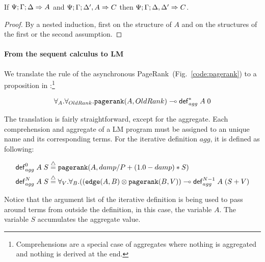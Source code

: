 \begin{theorem}
If $\Psi ; \Gamma ; \Delta \Rightarrow A$ and $\Psi ; \Gamma ; \Delta',
   A \Rightarrow C$ then $\Psi ; \Gamma ; \Delta, \Delta' \Rightarrow C$.
\end{theorem}
\begin{proof}
By a nested induction, first on the structure of $A$ and on the structures of
the first or the second assumption.
\end{proof}

\paragraph{From the \fragment sequent calculus to LM}

We translate the rule of the asynchronous PageRank~(Fig.~\ref{code:pagerank}) to
a proposition in \fragment:\footnote{Comprehensions are a special case of
aggregates where nothing is aggregated and nothing is derived at the end.}

{\stuffsize
\begin{align}
\forall_A. \forall_{OldRank}. \mathtt{pagerank}(A, OldRank) \multimap \mathsf{def}_{agg}^{*}
\; A \; 0
\end{align}
}

The translation is fairly straightforward, except for the aggregate. Each
comprehension and aggregate of a LM program must be assigned to an unique name and its
corresponding terms. For the iterative definition $agg$, it is defined as
following:

{\stuffsize
\begin{align}
\iterz{agg}{0} A \; S & \defeq \mathtt{pagerank}(A, damp/P + (1.0 -
         damp) * S)\\
\iterz{agg}{N} A \; S & \defeq \forall_V. \forall_B. ((\mathtt{edge}(A, B) \otimes
         \mathtt{pagerank}(B, V)) \lolli \iterz{agg}{N-1} A \; (S + V)
\end{align}
}

Notice that the argument list of the iterative definition is being used
to pass around terms from outside the definition, in this case, the variable
$A$. The variable $S$ accumulates the aggregate value.
